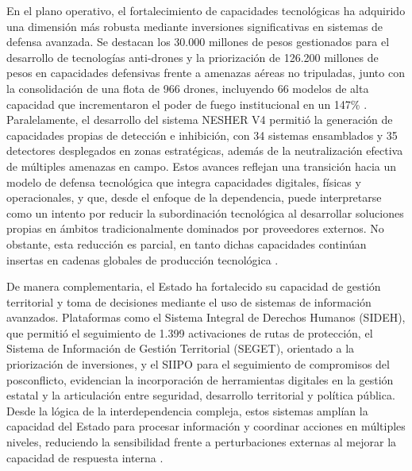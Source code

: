 En el plano operativo, el fortalecimiento de capacidades tecnológicas ha adquirido una dimensión más robusta mediante inversiones significativas en sistemas de defensa avanzada. Se destacan los 30.000 millones de pesos gestionados para el desarrollo de tecnologías anti-drones y la priorización de 126.200 millones de pesos en capacidades defensivas frente a amenazas aéreas no tripuladas, junto con la consolidación de una flota de 966 drones, incluyendo 66 modelos de alta capacidad que incrementaron el poder de fuego institucional en un 147\% \parencite{mindefensa_audiencia_rendicion_2025,mindefensa_100_logros_2026}. 
Paralelamente, el desarrollo del sistema NESHER V4 permitió la generación de capacidades propias de detección e inhibición, con 34 sistemas ensamblados y 35 detectores desplegados en zonas estratégicas, además de la neutralización efectiva de múltiples amenazas en campo. Estos avances reflejan una transición hacia un modelo de defensa tecnológica que integra capacidades digitales, físicas y operacionales, y que, desde el enfoque de la dependencia, puede interpretarse como un intento por reducir la subordinación tecnológica al desarrollar soluciones propias en ámbitos tradicionalmente dominados por proveedores externos. No obstante, esta reducción es parcial, en tanto dichas capacidades continúan insertas en cadenas globales de producción tecnológica \parencite{mindefensa_audiencia_rendicion_2025,cardoso_faletto_dependencia_1977}.

De manera complementaria, el Estado ha fortalecido su capacidad de gestión territorial y toma de decisiones mediante el uso de sistemas de información avanzados. Plataformas como el Sistema Integral de Derechos Humanos (SIDEH), que permitió el seguimiento de 1.399 activaciones de rutas de protección, el Sistema de Información de Gestión Territorial (SEGET), orientado a la priorización de inversiones, y el SIIPO para el seguimiento de compromisos del posconflicto, evidencian la incorporación de herramientas digitales en la gestión estatal y la articulación entre seguridad, desarrollo territorial y política pública. Desde la lógica de la interdependencia compleja, estos sistemas amplían la capacidad del Estado para procesar información y coordinar acciones en múltiples niveles, reduciendo la sensibilidad frente a perturbaciones externas al mejorar la capacidad de respuesta interna \parencite{mindefensa_siipo_implementacion_2025,mindefensa_audiencia_rendicion_2025}.

